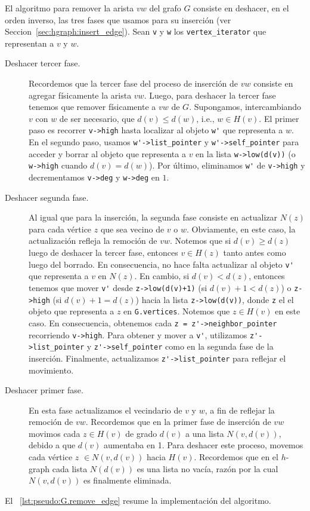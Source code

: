 \documentclass[%
    a4paper,%
    fontsize=12pt,%
    DIV=12,
    twoside,%
    openright,%
    titlepage=true,%
    headsepline,%
    toc=bibliography,%
    parskip=half,%
    cleardoublepage=empty,%
    headings=big,%
]{scrbook}
\makeatletter
\newcommand{\Code}[2][]{\lstinline[basicstyle={\ttfamily},#1]@#2@}
\makeatother
\begin{document}
El algoritmo para remover la arista $vw$ del grafo $G$ consiste en deshacer, en el orden inverso, las tres fases que usamos para su inserción (ver Seccion~\ref{sec:hgraph:insert_edge}).  Sean \Code{v} y \Code{w} los \Code{vertex_iterator} que representan a $v$ y $w$.

\begin{description}
\item[Deshacer tercer fase.] Recordemos que la tercer fase del proceso de inserción de $vw$ consiste en agregar físicamente la arista $vw$.  Luego, para deshacer la tercer fase tenemos que remover físicamente a $vw$ de $G$.  Supongamos, intercambiando $v$ con $w$ de ser necesario, que $d(v) \leq d(w)$, i.e., $w \in H(v)$.  El primer paso es recorrer \Code{v->high} hasta localizar al objeto \Code{w'} que representa a $w$.  En el segundo paso, usamos \Code{w'->list_pointer} y \Code{w'->self_pointer} para acceder y borrar al objeto que representa a $v$ en la lista \Code{w->low(d(v))} (o \Code{w->high} cuando $d(v) = d(w)$).  Por último, eliminamos \Code{w'} de \Code{v->high} y decrementamos \Code{v->deg} y \Code{w->deg} en $1$.

\item[Deshacer segunda fase.] Al igual que para la inserción, la segunda fase consiste en actualizar $N(z)$ para cada vértice $z$ que sea vecino de $v$ o $w$.  Obviamente, en este caso, la actualización refleja la remoción de $vw$.  Notemos que si $d(v) \geq d(z)$ luego de deshacer la tercer fase, entonces $v \in H(z)$ tanto antes como luego del borrado.  En consecuencia, no hace falta actualizar al objeto \Code{v'} que representa a $v$ en $N(z)$.  En cambio, si $d(v) < d(z)$, entonces tenemos que mover \Code{v'} desde \Code{z->low(d(v)+1)} (si $d(v)+1 < d(z)$) o \Code{z->high} (si $d(v)+1=d(z)$) hacia la lista \Code{z->low(d(v))}, donde \Code{z} el el objeto que representa a $z$ en \Code{G.vertices}.  Notemos que $z \in H(v)$ en este caso.  En consecuencia, obtenemos cada \Code{z = z'->neighbor_pointer} recorriendo \Code{v->high}.  Para obtener y mover a \Code{v'}, utilizamos \Code{z'->list_pointer} y \Code{z'->self_pointer} como en la segunda fase de la inserción.  Finalmente, actualizamos \Code{z'->list_pointer} para reflejar el movimiento.

\item[Deshacer primer fase.] En esta fase actualizamos el vecindario de $v$ y $w$, a fin de reflejar la remoción de $vw$.  Recordemos que en la primer fase de inserción de $vw$ movimos cada $z \in H(v)$  de grado $d(v)$ a una lista $N(v,d(v))$, debido a que $d(v)$ aumentaba en 1. Para deshacer este proceso, movemos cada vértice $z$ $\in N(v,d(v))$  hacia $H(v)$. Recordemos que en el $h$-graph cada lista $N(d(v))$ es una lista no vacía, razón por la cual $N(v,d(v))$ es finalmente eliminada.
\end{description}
El \lstlistingname~\ref{lst:pseudo:G.remove_edge} resume la implementación del algoritmo.
\end{document}
